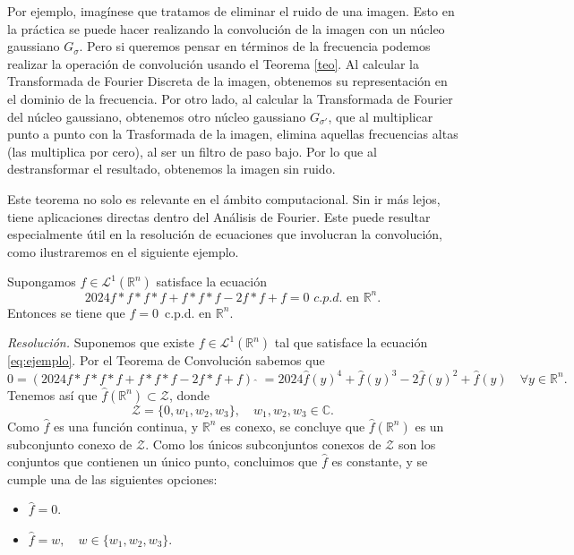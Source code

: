 \noindent Por ejemplo, imagínese que tratamos de eliminar el ruido de una imagen. Esto en la práctica se puede hacer realizando la convolución de la imagen con un núcleo gaussiano $G_{\sigma}$. Pero si queremos pensar en términos de la frecuencia podemos realizar la operación de convolución usando el Teorema \ref{teo}. Al calcular la Transformada de Fourier Discreta de la imagen, obtenemos su representación en el dominio de la frecuencia. Por otro lado, al calcular la Transformada de Fourier del núcleo gaussiano, obtenemos otro núcleo gaussiano $G_{\sigma'}$, que al multiplicar punto a punto con la Trasformada de la imagen,
elimina aquellas frecuencias altas (las multiplica por cero), al ser un filtro de paso bajo. Por lo que al destransformar el resultado, obtenemos la imagen sin ruido. 

\vspace{0,5cm}
\noindent Este teorema  no solo es relevante en el ámbito computacional. Sin ir más lejos, tiene aplicaciones directas dentro del Análisis de Fourier.
Este puede resultar especialmente útil en la resolución de ecuaciones que involucran la convolución, como ilustraremos en el siguiente ejemplo.

\begin{ejemplo}
    Supongamos $f \in \mathscr{L}^1(\mathbb{R}^n)$ satisface la ecuación
    \begin{equation}\label{eq:ejemplo}
    2024f*f*f*f+f*f*f-2f*f+f = 0 \, \, c.p.d. \, \,\text{en}\, \, \mathbb{R}^n.
    \end{equation}
    Entonces se tiene que $f = 0 \,$ c.p.d.  en $ \mathbb{R}^n$.                                    
\end{ejemplo}
\noindent \textit{Resolución.} 
Suponemos que existe $f \in \mathscr{L}^1(\mathbb{R}^n)$ tal que satisface la ecuación \eqref{eq:ejemplo}. Por el Teorema de Convolución sabemos que
\begin{equation}
    0 = (2024f*f*f*f+f*f*f-2f*f+f) \,\, \widehat{} \; = 2024\widehat{f}(y)^4+\widehat{f}(y)^3-2\widehat{f}(y)^2+\widehat{f}(y) \quad \forall y  \in \mathbb{R}^n.
\end{equation}
Tenemos así que $\widehat{f}\left(\mathbb{R}^n\right) \subset \mathcal{Z}$, donde
\begin{equation}
    \mathcal{Z} = \{0,w_1,w_2,w_3\}, \quad w_1,w_2,w_3 \in \mathbb{C}.
\end{equation}
Como $\widehat{f}$ es una función continua, y $\mathbb{R}^n$ es conexo, se concluye que $\widehat{f}(\mathbb{R}^n)$ es un subconjunto conexo de $\mathcal{Z}$. Como los únicos subconjuntos conexos de  $\mathcal{Z}$ son los conjuntos que contienen un único punto, concluimos que $\widehat{f}$ es constante, y se cumple una de las siguientes opciones: 
\begin{itemize}
    \item $\widehat{f}=0$.
    \item $\widehat{f}=w, \quad  w \in \{w_1,w_2,w_3\}$.
\end{itemize} 


